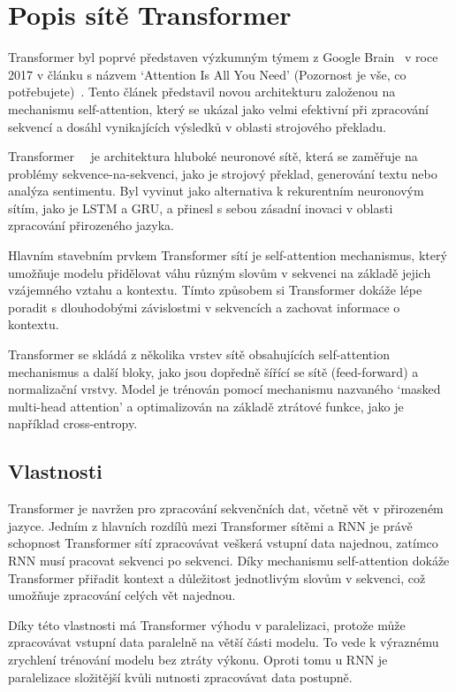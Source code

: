 \chapter{Popis sítě Transformer}
Transformer byl poprvé představen výzkumným týmem z Google Brain~\cite{link31} v roce 2017 v článku s názvem `Attention Is All You Need' (Pozornost je vše, co potřebujete)~\cite{link27}.
Tento článek představil novou architekturu založenou na mechanismu self-attention, který se ukázal jako velmi efektivní při zpracování sekvencí a dosáhl vynikajících výsledků v oblasti strojového překladu.

Transformer~\cite{link28}~\cite{link25} je architektura hluboké neuronové sítě, která se zaměřuje na problémy sekvence-na-sekvenci, jako je strojový překlad, generování textu nebo analýza sentimentu.
Byl vyvinut jako alternativa k rekurentním neuronovým sítím, jako je LSTM a GRU, a přinesl s sebou zásadní inovaci v oblasti zpracování přirozeného jazyka.

Hlavním stavebním prvkem Transformer sítí je self-attention mechanismus, který umožňuje modelu přidělovat váhu různým slovům v sekvenci na základě jejich vzájemného vztahu a kontextu.
Tímto způsobem si Transformer dokáže lépe poradit s dlouhodobými závislostmi v sekvencích a zachovat informace o kontextu.

Transformer se skládá z několika vrstev sítě obsahujících self-attention mechanismus a další bloky, jako jsou dopředně šířící se sítě (feed-forward) a normalizační vrstvy.
Model je trénován pomocí mechanismu nazvaného `masked multi-head attention' a optimalizován na základě ztrátové funkce, jako je například cross-entropy.

\section{Vlastnosti}
Transformer je navržen pro zpracování sekvenčních dat, včetně vět v přirozeném jazyce.
Jedním z hlavních rozdílů mezi Transformer sítěmi a RNN je právě schopnost Transformer sítí zpracovávat veškerá vstupní data najednou, zatímco RNN musí pracovat sekvenci po sekvenci.
Díky mechanismu self-attention dokáže Transformer přiřadit kontext a důležitost jednotlivým slovům v sekvenci, což umožňuje zpracování celých vět najednou.

Díky této vlastnosti má Transformer výhodu v paralelizaci, protože může zpracovávat vstupní data paralelně na větší části modelu.
To vede k výraznému zrychlení trénování modelu bez ztráty výkonu.
Oproti tomu u RNN je paralelizace složitější kvůli nutnosti zpracovávat data postupně.

